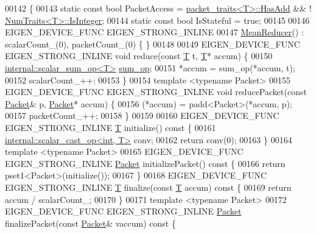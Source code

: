 \begin{DoxyCode}
00142 \{
00143   \textcolor{keyword}{static} \textcolor{keyword}{const} \textcolor{keywordtype}{bool} PacketAccess = \hyperlink{struct_eigen_1_1internal_1_1packet__traits}{packet\_traits<T>::HasAdd} && !
      \hyperlink{group___core___module_struct_eigen_1_1_num_traits}{NumTraits<T>::IsInteger};
00144   \textcolor{keyword}{static} \textcolor{keyword}{const} \textcolor{keywordtype}{bool} IsStateful = \textcolor{keyword}{true};
00145 
00146   EIGEN\_DEVICE\_FUNC EIGEN\_STRONG\_INLINE
00147   \hyperlink{struct_eigen_1_1internal_1_1_mean_reducer}{MeanReducer}() : scalarCount\_(0), packetCount\_(0) \{ \}
00148 
00149   EIGEN\_DEVICE\_FUNC EIGEN\_STRONG\_INLINE \textcolor{keywordtype}{void} reduce(\textcolor{keyword}{const} \hyperlink{group___sparse_core___module}{T} t, \hyperlink{group___sparse_core___module}{T}* accum) \{
00150     \hyperlink{struct_eigen_1_1internal_1_1scalar__sum__op}{internal::scalar\_sum\_op<T>} \hyperlink{struct_eigen_1_1internal_1_1sum__op}{sum\_op};
00151     *accum = sum\_op(*accum, t);
00152     scalarCount\_++;
00153   \}
00154   \textcolor{keyword}{template} <\textcolor{keyword}{typename} Packet>
00155   EIGEN\_DEVICE\_FUNC EIGEN\_STRONG\_INLINE \textcolor{keywordtype}{void} reducePacket(\textcolor{keyword}{const} \hyperlink{union_eigen_1_1internal_1_1_packet}{Packet}& p, 
      \hyperlink{union_eigen_1_1internal_1_1_packet}{Packet}* accum) \{
00156     (*accum) = padd<Packet>(*accum, p);
00157     packetCount\_++;
00158   \}
00159 
00160   EIGEN\_DEVICE\_FUNC EIGEN\_STRONG\_INLINE \hyperlink{group___sparse_core___module}{T} initialize()\textcolor{keyword}{ const }\{
00161     \hyperlink{struct_eigen_1_1internal_1_1scalar__cast__op}{internal::scalar\_cast\_op<int, T>} conv;
00162     \textcolor{keywordflow}{return} conv(0);
00163   \}
00164   \textcolor{keyword}{template} <\textcolor{keyword}{typename} Packet>
00165   EIGEN\_DEVICE\_FUNC EIGEN\_STRONG\_INLINE \hyperlink{union_eigen_1_1internal_1_1_packet}{Packet} initializePacket()\textcolor{keyword}{ const }\{
00166     \textcolor{keywordflow}{return} pset1<Packet>(initialize());
00167   \}
00168   EIGEN\_DEVICE\_FUNC EIGEN\_STRONG\_INLINE \hyperlink{group___sparse_core___module}{T} finalize(\textcolor{keyword}{const} \hyperlink{group___sparse_core___module}{T} accum)\textcolor{keyword}{ const }\{
00169     \textcolor{keywordflow}{return} accum / scalarCount\_;
00170   \}
00171   \textcolor{keyword}{template} <\textcolor{keyword}{typename} Packet>
00172   EIGEN\_DEVICE\_FUNC EIGEN\_STRONG\_INLINE \hyperlink{union_eigen_1_1internal_1_1_packet}{Packet} finalizePacket(\textcolor{keyword}{const} \hyperlink{union_eigen_1_1internal_1_1_packet}{Packet}& vaccum)\textcolor{keyword}{ const }\{

\end{DoxyCode}
